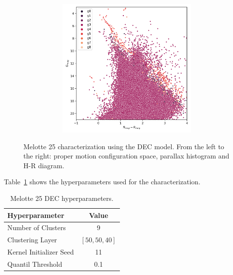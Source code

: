 \documentclass[11pt,a4paper,english,twocolumn]{article}
\begin{document}
\begin{figure}[htbp]
\begin{subfigure}{\columnwidth}
\begin{subfigure}[t]{0.30\textwidth}
    \end{subfigure}
    \hfill
    \begin{subfigure}[t]{0.30\textwidth}
      \centering
      \includegraphics[width=\textwidth]{../figures/melotte_25/dec_hr_diagram_melotte_25.png}
    \end{subfigure}
  \end{subfigure}
  \caption{Melotte 25 characterization using the DEC model.
           From the left to the right: proper motion configuration
           space, parallax histogram and H-R diagram.}
  \label{fig:result_melotte_25_dec}
\end{figure}

Table~\ref{tab:hyperparameters_melotte_25} shows the hyperparameters
used for the characterization.

\begin{table}[h]
  \begin{center}
    \begin{tabular}{l|c}
      \textbf{Hyperparameter} & \textbf{Value} \\
      \hline
      Number of Clusters & 9 \\
      Clustering Layer & \(\left[ 50, 50, 40 \right]\) \\
      Kernel Initializer Seed & 11 \\
      Quantil Threshold & 0.1 \\
    \end{tabular}
    \caption{Melotte 25 DEC hyperparameters.}
    \label{tab:hyperparameters_melotte_25}
  \end{center}
\end{table}
\end{document}
